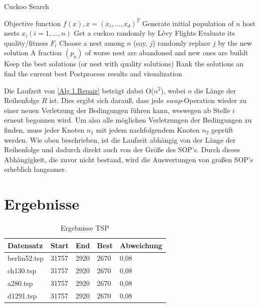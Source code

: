\documentclass[conference]{IEEEtran}
\begin{document}
      \begin{algorithm}
        \caption{Cuckoo Search}\label{2}
        \begin{algorithmic}[1]
        \State Objective function $f(x), x = (x_{i}, ...,x_{d})^T$
        \State Generate initial population of $n$ host nests $x_{i} (i =1,...,n)$
          \State Get a cuckoo randomly by Lévy Flights
          \State Evaluate its quality/fitness $F_{i}$
          \State Choose a nest among $n$ (say, $j$) randomly
            \State replace $j$ by the new solution
          \EndIf
          \State A fraction $(p_{a})$ of worse nest are abandoned 
          \State and new ones are buildt 
          \State Keep the best solutions (or nest with quality solutions)
          \State Rank the solutions an find the current best
        \EndWhile
        \State Postprocess results and visualization
        
        \end{algorithmic}
        \end{algorithm}

      Die Laufzeit von \ref{Alg.1.Repair} beträgt dabei O($n^2$), wobei $n$ die Länge der Reihenfolge $R$ ist. Dies ergibt sich darauß, dass
      jede $swap$-Operation wieder zu einer neuen Verletzung der Bedingungen führen kann, weswegen ab Stelle $i$ erneut begonnen wird. Um also alle möglichen Verletzungen
      der Bedingungen zu finden, muss jeder Knoten $n_1$ mit jedem nachfolgendem Knoten $n_2$ geprüft werden. 
      Wie oben beschrieben, ist die Laufzeit abhängig von der Länge der Reihenfolge und dadurch direkt auch von der Größe des SOP's. 
      Durch dieses Abhängigkeit, die zuvor nicht bestand, wird die Auswertungen von großen SOP's erheblich langsamer. 


  \section{Ergebnisse}

    \begin{table}[h]
      \label{TSP}
      \centering
      \begin{tabular}{|l|ll|l|l|}
      \hline
          Datensatz & \multicolumn{1}{l|}{Start} & End  & Best & Abweichung \\ \hline
          berlin52.tsp  & \multicolumn{1}{l|}{31757} & 2920 & 2670 & 0,08       \\ \hline
          ch130.tsp  & \multicolumn{1}{l|}{31757} & 2920 & 2670 & 0,08       \\ \hline
          a280.tsp  & \multicolumn{1}{l|}{31757} & 2920 & 2670 & 0,08       \\ \hline
          d1291.tsp  & \multicolumn{1}{l|}{31757} & 2920 & 2670 & 0,08       \\ \hline
      \end{tabular}
      \caption[]{Ergebnisse TSP}
    \end{table}
\end{document}
